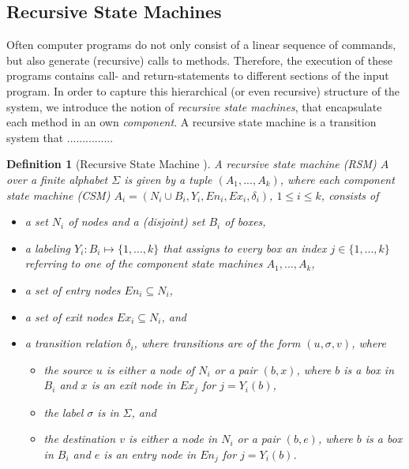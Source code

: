 \documentclass[a4paper, 12pt, twoside]{report}
\theoremstyle{plain}
\newtheorem{definition}[theorem]{Definition}
\begin{document}
	\subsection{Recursive State Machines}
	
	Often computer programs do not only consist of a linear sequence of commands, but also generate (recursive) calls to methods. Therefore, the execution of these programs contains call- and return-statements to different sections of the input program. In order to capture this hierarchical (or even recursive) structure of the system, we introduce the notion of \textit{recursive state machines}, that encapsulate each method in an own \textit{component}. A recursive state machine is a transition system that ...............
	
	\begin{definition}[Recursive State Machine \cite{alur2001analysis}]\label{def:rsm}
		A \textup{recursive state machine} (RSM) $A$ over a finite alphabet $\Sigma$ is given by a tuple $(A_1, ..., A_k)$, where each \textup{component state machine} (CSM) $A_i = (N_i \cup B_i, Y_i, En_i, Ex_i, \delta_i)$, $1 \leq i \leq k$, consists of
		\begin{itemize}
			\item a set $N_i$ of \textup{nodes} and a (disjoint) set $B_i$ of \textup{boxes},
			\item a \textup{labeling} $Y_i: B_i \mapsto \{1, ..., k\}$ that assigns to every box an index $j \in \{1, ..., k\}$ referring to one of the component state machines $A_1, ..., A_k$,
			\item a set of \textup{entry nodes} $En_i \subseteq N_i$,
			\item a set of \textup{exit nodes} $Ex_i \subseteq N_i$, and
			\item a \textup{transition relatio}n $\delta_i$, where transitions are of the form $(u, \sigma, v)$, where 
			\begin{itemize}
				\item the source $u$ is either a node of $N_i$ or a pair $(b, x)$, where $b$ is a box in $B_i$ and $x$ is an exit node in $Ex_j$ for $j = Y_i(b)$,
				\item the label $\sigma$ is in $\Sigma$, and 
				\item the destination $v$ is either a node in $N_i$ or a pair $(b, e)$, where $b$ is a box in $B_i$ and $e$ is an entry node in $En_j$ for $j = Y_i(b)$.
			\end{itemize}
		\end{itemize}
	\end{definition}
	
\end{document}
